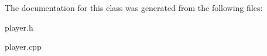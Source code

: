 The documentation for this class was generated from the following files\+:\begin{DoxyCompactItemize}
\item 
player.\+h\item 
player.\+cpp\end{DoxyCompactItemize}
